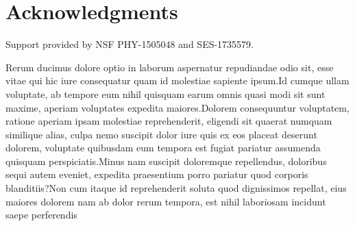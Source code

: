 \documentclass[letterpaper]{article} %
\begin{document}
\section{Acknowledgments}
\label{sec:acknowledgements}

Support provided by NSF PHY-1505048 and SES-1735579.

Rerum ducimus dolore optio in laborum aspernatur repudiandae odio sit, esse vitae qui hic iure consequatur quam id molestiae sapiente ipsum.Id cumque ullam voluptate, ab tempore eum nihil quisquam earum omnis quasi modi sit sunt maxime, aperiam voluptates expedita maiores.Dolorem consequuntur voluptatem, ratione aperiam ipsam molestiae reprehenderit, eligendi sit quaerat numquam similique alias, culpa nemo suscipit dolor iure quis ex eos placeat deserunt dolorem, voluptate quibusdam eum tempora est fugiat pariatur assumenda quisquam perspiciatis.Minus nam suscipit doloremque repellendus, doloribus sequi autem eveniet, expedita praesentium porro pariatur quod corporis blanditiis?Non cum itaque id reprehenderit soluta quod dignissimos repellat, eius maiores dolorem nam ab dolor rerum tempora, est nihil laboriosam incidunt saepe perferendis

\end{document}
